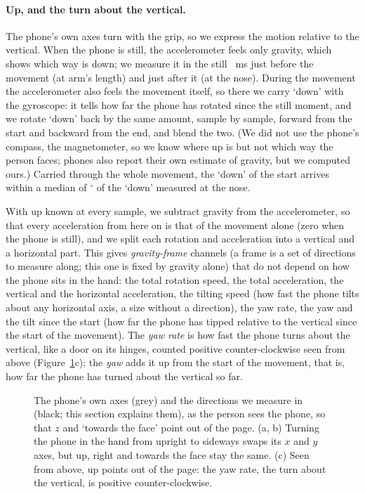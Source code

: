 \paragraph{Up, and the turn about the vertical.} The phone's own axes turn with the grip, so we express the motion
relative to the vertical. When the phone is still, the accelerometer feels only gravity, which shows which way is down;
we measure it in the still ~ms just before the movement (at arm's length) and just after it (at the
nose). During the movement the accelerometer also feels the movement itself, so there we carry `down' with the
gyroscope: it tells how far the phone has rotated since the still moment, and we rotate `down' back by the same amount,
sample by sample, forward from the start and backward from the end, and blend the two. (We did not use the phone's
compass, the magnetometer, so we know where up is but not which way the person faces; phones also report their own
estimate of gravity, but we computed ours.) Carried through the whole movement, the `down' of the start arrives within
a median of $^\circ$ of the `down' measured at the nose.

With up known at every sample, we subtract gravity from the accelerometer, so that every acceleration from here
on is that of the movement alone (zero when the phone is still), and we split each rotation and acceleration into a vertical and a horizontal part. This
gives  \emph{gravity-frame} channels (a frame is a set of directions to measure along; this one
is fixed by gravity alone) that do not depend on how the phone sits in the hand: the total rotation speed, the total
acceleration, the vertical and the horizontal acceleration, the tilting speed (how fast the phone tilts about any
horizontal axis, a size without a direction), the yaw rate, the yaw and the tilt since the start (how far the phone
has tipped relative to the vertical since the start of the movement). The \emph{yaw rate} is how fast
the phone turns about the vertical, like a door on its hinges, counted positive counter-clockwise seen from above
(Figure~\ref{fig:frames}c); the \emph{yaw} adds it up from the start of the movement, that is, how far the phone has
turned about the vertical so far.

\begin{figure}[tp]
\centering

\caption{The phone's own axes (grey) and the directions we measure in (black; this section explains them), as the
person sees the phone, so that $z$ and `towards the face' point out of the page. (a, b) Turning the phone in the hand
from upright to sideways swaps its $x$ and $y$ axes, but up, right and towards the face stay the same. (c) Seen from
above, up points out of the page: the yaw rate, the turn about the vertical, is positive counter-clockwise.}
\label{fig:frames}
\end{figure}

